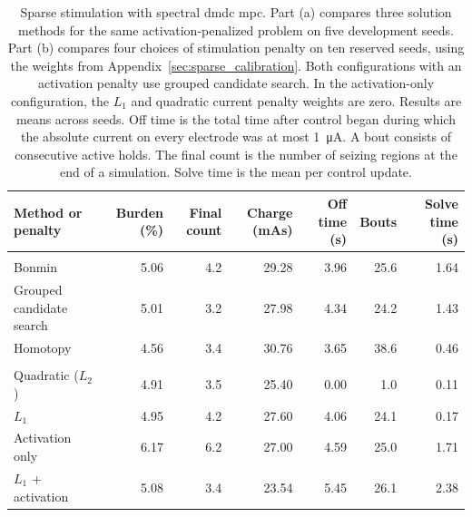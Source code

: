 \begin{table}
  \centering
  \caption{Sparse stimulation with spectral \ac{dmdc} \ac{mpc}.
  Part (a) compares three solution methods for the same activation-penalized problem on five development seeds.
  Part (b) compares four choices of stimulation penalty on ten reserved seeds, using the weights from Appendix~\ref{sec:sparse_calibration}. %
  Both configurations with an activation penalty use grouped candidate search.
  In the activation-only configuration, the \(L_1\) and quadratic current penalty weights are zero.
  Results are means across seeds.
  Off time is the total time after control began during which the absolute current on every electrode was at most \SI{1}{\micro\ampere}.
  A bout consists of consecutive active holds.
  The final count is the number of seizing regions at the end of a simulation.
  Solve time is the mean per control update.}\label{tab:sparse_stimulation_results}
  \setlength{\tabcolsep}{2pt}
  \begin{tabular*}{\linewidth}{@{\extracolsep{\fill}}lrrrrrr@{}}
    \toprule
    Method or penalty & Burden (\%) & Final count & Charge (mAs) & Off time (s) & Bouts & Solve time (s) \\
    \midrule
    \addlinespace[2pt]
    \multicolumn{7}{@{}l}{\textit{(a) Solution methods for the binary activation problem}} \\
    \addlinespace[2pt]
    Bonmin                   & 5.06 & 4.2 & 29.28 & 3.96 & 25.6 & 1.64 \\
    Grouped candidate search & 5.01 & 3.2 & 27.98 & 4.34 & 24.2 & 1.43 \\
    Homotopy                 & 4.56 & 3.4 & 30.76 & 3.65 & 38.6 & 0.46 \\
    \addlinespace
    \multicolumn{7}{@{}l}{\textit{(b) Stimulation penalties}} \\
    \addlinespace[2pt]
    Quadratic (\(L_2\))  & 4.91 & 3.5 & 25.40 & 0.00 &  1.0 & 0.11 \\
    \(L_1\)              & 4.95 & 4.2 & 27.60 & 4.06 & 24.1 & 0.17 \\
    Activation only      & 6.17 & 6.2 & 27.00 & 4.59 & 25.0 & 1.71 \\
    \(L_1\) + activation & 5.08 & 3.4 & 23.54 & 5.45 & 26.1 & 2.38 \\
    \bottomrule
  \end{tabular*}
\end{table}

